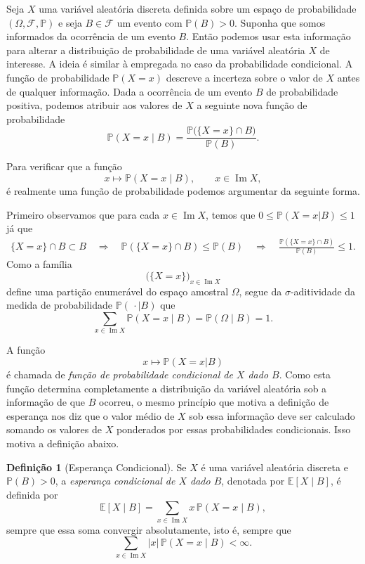 \documentclass[12pt,portuguese]{article}
\theoremstyle{definition}
\newtheorem{definition}[definition]{Definição}
\begin{document}
Seja \(X\) uma variável aleatória discreta definida sobre um espaço de
probabilidade \((\Omega, \mathcal{F}, \mathbb{P})\) e seja \(B \in \mathcal{F}\)
um evento com \(\mathbb{P}(B) > 0\). Suponha que somos informados da ocorrência
de um evento \(B\). Então podemos usar esta informação 
para alterar a distribuição de probabilidade de uma variável aleatória
\(X\) de interesse. 
A ideia é similar à empregada no caso da probabilidade condicional. 
A função de probabilidade \(\mathbb{P}(X = x)\) descreve a incerteza
sobre o valor de $X$ antes de qualquer informação. 
Dada a ocorrência de um evento $B$ de probabilidade positiva,
podemos atribuir aos valores de $X$ a seguinte nova função de probabilidade
\[
\mathbb{P}(X = x \mid B)
= \frac{\mathbb{P}\bigl(\{X = x\} \cap B\bigr)}{\mathbb{P}(B)}.
\]

Para verificar que a função 
\[
x \longmapsto \mathbb{P}(X = x \mid B), \qquad x \in \operatorname{Im} X,
\]
é realmente uma função de probabilidade podemos argumentar da seguinte forma. 

Primeiro observamos que para cada $x\in \operatorname{Im} X$, temos 
que $0\leqslant \mathbb{P}(X=x|B)\leqslant 1$ já que 
\begin{align*}
\{X=x\}\cap B \subset B 
\quad \Longrightarrow \quad 
\mathbb{P}(\{X=x\}\cap B)\leqslant \mathbb{P}(B)
\quad \Longrightarrow \quad 
\frac{ \mathbb{P}(\{X=x\} \cap B) }{\mathbb{P}(B)} \leqslant 1.
\end{align*}
Como a família 
\[ 
\bigl(\{X = x\}\bigr)_{x \in \operatorname{Im} X}
\] 
define uma partição enumerável do espaço amostral \(\Omega\), 
segue da \(\sigma\)-aditividade da medida de probabilidade
\(\mathbb{P}(\,\cdot\mid B)\) que
\[
\sum_{x \in \operatorname{Im} X} \mathbb{P}(X = x \mid B)
= \mathbb{P}(\Omega \mid B) = 1.
\]


A função 
\[
x\longmapsto \mathbb{P}(X=x|B)
\]
é chamada de \emph{função de probabilidade condicional de \(X\) dado
\(B\)}. Como esta função determina completamente a distribuição da variável
aleatória sob a informação de que \(B\) ocorreu, o mesmo princípio que motiva a definição de
esperança nos diz que o valor médio de \(X\) sob essa informação deve ser
calculado somando os valores de \(X\) ponderados por essas probabilidades
condicionais. Isso motiva a definição abaixo.

\begin{definition}[Esperança Condicional]\label{def:esperanca-condicional}
Se \(X\) é uma variável aleatória discreta e \(\mathbb{P}(B) > 0\), a
\emph{esperança condicional de \(X\) dado \(B\)}, denotada por
\(\mathbb{E}[X \mid B]\), é definida por
\begin{equation}\label{eq:esperanca-condicional}
\mathbb{E}[X \mid B]
= \sum_{x \in \operatorname{Im} X} x \, \mathbb{P}(X = x \mid B),
\end{equation}
sempre que essa soma convergir absolutamente, isto é, sempre que
\[
\sum_{x \in \operatorname{Im} X} |x| \, \mathbb{P}(X = x \mid B) < \infty.
\]
\end{definition}
\end{document}
